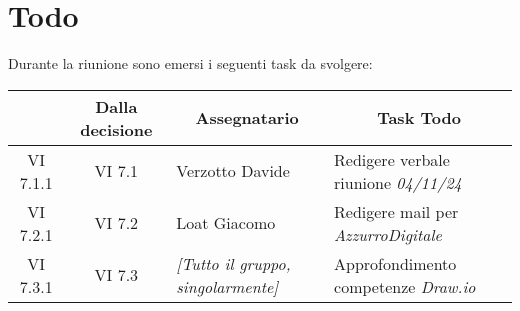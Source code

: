 

\section{Todo}

Durante la riunione sono emersi i seguenti task da svolgere:

\vspace{0.5cm}

\begin{table}[htbp]
\centering
{}
\begin{tabular}{|c|c|p{}|p{}|}
    \hline
    \rowcolor[gray]{0.75}
    \multicolumn{1}{|c|}{\textbf{Codice}} & \multicolumn{1}{|c|}{\textbf{Dalla decisione}} & \multicolumn{1}{|c|}{\textbf{Assegnatario}} & \multicolumn{1}{|c|}{\textbf{Task Todo}} \\
    \hline
    VI 7.1.1 & VI 7.1 & Verzotto Davide & Redigere verbale riunione \emph{04/11/24} \\
    \hline
    VI 7.2.1 & VI 7.2 & Loat Giacomo & Redigere mail per \emph{AzzurroDigitale} \\
    \hline
    VI 7.3.1 & VI 7.3 & \emph{[Tutto il gruppo, singolarmente]} & Approfondimento competenze \emph{Draw.io} \\
    \hline
\end{tabular}
\end{table}
